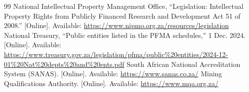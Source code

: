 \documentclass[10pt,a4paper,twocolumn]{article}
\begin{document}
\begin{thebibliography}{99}
 National Intellectual Property Management Office, ``Legislation: Intellectual Property Rights from Publicly Financed Research and Development Act 51 of 2008.'' [Online]. Available: \url{https://www.nipmo.org.za/resources/legislation}
 National Treasury, ``Public entities listed in the PFMA schedules,'' 1 Dec. 2024. [Online]. Available: \url{https://www.treasury.gov.za/legislation/pfma/public%20entities/2024-12-01%20Nat%20depts%20and%20ents.pdf}
 South African National Accreditation System (SANAS). [Online]. Available: \url{https://www.sanas.co.za/}
 Mining Qualifications Authority. [Online]. Available: \url{https://www.mqa.org.za/}
\end{thebibliography}
\normalsize

\end{document}
